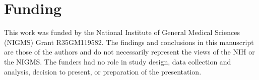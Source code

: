 \documentclass[preprint,authoryear]{elsarticle}
\begin{document}
\section{Funding}
This work was funded by the National Institute of General Medical Sciences (NIGMS) Grant R35GM119582. The findings and conclusions in this manuscript are those of the authors and do not necessarily represent the views of the NIH or the NIGMS. The funders had no role in study design, data collection and analysis, decision to present, or preparation of the presentation.



\section*{\refname}


\clearpage
\end{document}
